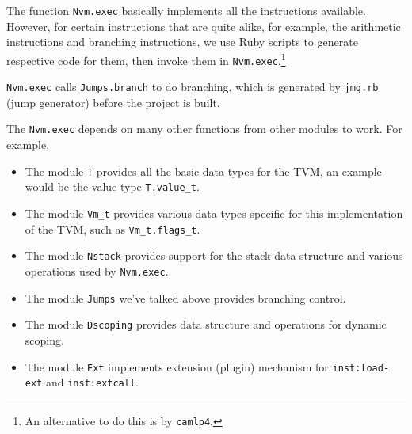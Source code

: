 \documentclass{report}
\newcommand{\inst}[1] {\texttt{inst:#1}}
\begin{document}
The function \texttt{Nvm.exec} basically implements all the instructions available. However, for certain instructions that are quite alike, for example, the arithmetic instructions and branching instructions, we use Ruby scripts to generate respective code for them, then invoke them in \texttt{Nvm.exec}.\footnote{An alternative to do this is by \texttt{camlp4}.}

\begin{mdframed}[style=example]
  \texttt{Nvm.exec} calls \texttt{Jumps.branch} to do branching, which is generated by \texttt{jmg.rb} (jump generator) before the project is built.
\end{mdframed}

\begin{mdframed}[style=detail]
The \texttt{Nvm.exec} depends on many other functions from other modules to work. For example,

\begin{itemize}
\item The module \texttt{T} provides all the basic data types for the TVM, an example would be the value type \texttt{T.value\_t}.

\item The module \texttt{Vm\_t} provides various data types specific for this implementation of the TVM, such as \texttt{Vm\_t.flags\_t}.

\item The module \texttt{Nstack} provides support for the stack data
  structure and various operations used by \texttt{Nvm.exec}.

\item The module \texttt{Jumps} we've talked above provides branching control.

\item The module \texttt{Dscoping} provides data structure and operations for dynamic scoping.

\item The module \texttt{Ext} implements extension (plugin) mechanism for \inst{load-ext} and \inst{extcall}.
\end{itemize}
\end{mdframed}
\end{document}
